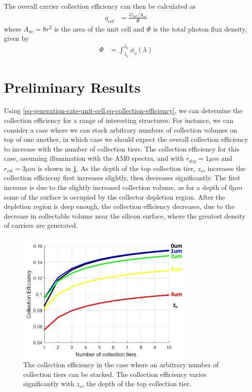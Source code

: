 \documentclass[journal,twoside]{IEEEtran}
\begin{document}
The overall carrier collection efficiency can then be calculated as
\begin{align}
	\eta_{col} &= \frac{G_{tot} / A_{uc} }{\Phi}	\label{eq-collection-efficiency}
\end{align}
where $A_{uc} = 8r^2$ is the area of the unit cell and $\Phi$ is the total photon flux density, given by
\begin{align}
	\Phi &= \int_{\lambda_a}^{\lambda_b} \phi_o(\lambda)
\end{align}

\section{Preliminary Results}
Using \cref{eq-generation-rate-unit-cell,eq-collection-efficiency}, we can determine the collection efficiency
for a range of interesting structures. For instance, we can consider a case where we can stack arbitrary numbers
of collection volumes on top of one another, in which case we should expect the overall collection efficiency
to increase with the number of collection tiers. The collection efficiency for this case, assuming illumination with the AM0
spectra, and with $r_{dep}=1\mu m$ and $r_{col} = 3\mu m$ is shown in
\cref{f-collection-efficiency-arbitrary-tiers}. As the depth of the top collection tier, $z_o$, increases the collection
efficiecny first increases slightly, then decreases significantly. The first increase is due to the slightly increased collection
volume, as for a depth of $0\mu m$ some of the surface is occupied by the collector depletion region. After the depletion region
is deep enough, the collection efficiency decreases, due to the decrease in collectable volume near the silicon surface,
where the greatest density of carriers are generated.

\begin{figure}[tb]
	\centering
	\includegraphics[width=3.5in]{figures/eta_col_fcc_stack_arbitrary_tiers.png}
	\caption{	The collection efficiency in the case where an arbitrary number of collection tiers can be stacked.
				The collection efficiency varies significantly with $z_o$, the depth of the top collection tier.
			}
	\label{f-collection-efficiency-arbitrary-tiers}
\end{figure}
\end{document}
